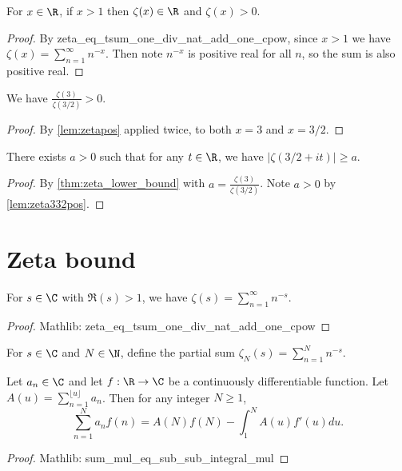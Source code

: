 \begin{lemma}\label{lem:zetapos} 
\leanok
For $x\in \R$, if $x>1$ then $\zeta(x)\in \R$ and $\zeta(x)>0$.
\end{lemma}
\begin{proof}
\leanok
By zeta\_eq\_tsum\_one\_div\_nat\_add\_one\_cpow, since $x>1$ we have
$\zeta(x)=\sum_{n=1}^\infty n^{-x}$. Then note $n^{-x}$ is positive real for all $n$, so the sum is also positive real.
\end{proof}

\begin{lemma}\label{lem:zeta332pos} 
\leanok
We have $\frac{\zeta(3)}{\zeta(3/2)}>0$.
\end{lemma}
\begin{proof}
\leanok
{}
By \cref{lem:zetapos} applied twice, to both $x=3$ and $x=3/2$.
\end{proof}

\begin{lemma}\label{lem:zeta_low_332} 
\leanok
There exists $a>0$ such that for any $t\in\R$, we have $|\zeta(3/2+it)| \ge a$.
\end{lemma}
\begin{proof}
\leanok
{}
By \cref{thm:zeta_lower_bound} with $a=\frac{\zeta(3)}{\zeta(3/2)}$. Note $a>0$ by \cref{lem:zeta332pos}.
\end{proof}


\section{Zeta bound}

\begin{lemma}\label{lem:zetaLimit}
\leanok
For $s\in\C$ with $\Re(s)>1$, we have $\zeta(s) = \sum_{n=1}^\infty n^{-s}$.
\end{lemma}
\begin{proof}
\leanok
Mathlib: zeta\_eq\_tsum\_one\_div\_nat\_add\_one\_cpow
\end{proof}

\begin{definition}\label{def:zetaPartialSum}
 \leanok
For $s\in\C$ and $N\in\N$, define the partial sum $\zeta_N(s) = \sum_{n=1}^N n^{-s}$.
\end{definition}


\begin{lemma}\label{lem:abelSummation}
\leanok
Let $a_n \in \C$ and let $f: \R \to \C$ be a continuously differentiable function. Let $A(u) = \sum_{n=1}^{\lfloor u \rfloor} a_n$. Then for any integer $N\ge 1$,
\[ \sum_{n=1}^N a_n f(n) = A(N)f(N) - \int_1^N A(u) f'(u) du. \]
\end{lemma}
\begin{proof}
\leanok
Mathlib: sum\_mul\_eq\_sub\_sub\_integral\_mul
\end{proof}


